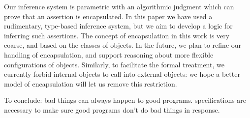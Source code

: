Our inference system is parametric with an algorithmic judgment which
can prove that an assertion is encapsulated. In this paper we have
used a rudimentary, type-based inference system, but we aim to develop
a logic for inferring such assertions. The concept of encapsulation in
this work is very coarse, and based on the classes of objects. In the
future, we plan to refine our handling of encapsulation, and support
reasoning about more flexible configurations of objects.  Similarly,
to facilitate the formal treatment, we currently forbid internal
objects to call into external objects: we hope a better model of
encapsulation will let us remove this restriction.


To conclude: bad things can always happen to good programs. \Nec
specifications are necessary to make sure good programs don't do bad
things in response.
